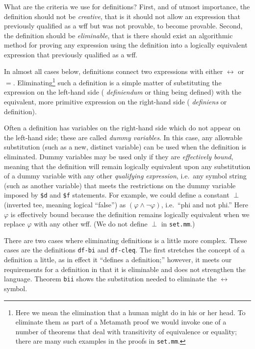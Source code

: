What are the criteria we use for definitions?  First, and of utmost importance,
the definition should not be {\em creative}, that
is it should not allow an expression that previously qualified as a wff but
was not provable, to become provable.   Second, the definition should be {\em
eliminable}, that is there should exist an
algorithmic method for proving any expression using the definition into
a logically equivalent expression that previously qualified as a wff.

In almost all cases below, definitions connect two expressions with either
$\leftrightarrow$ or $=$.  Eliminating\footnote{Here we mean the
elimination that a human might do in his or her head.  To eliminate them as
part of a Metamath proof we would invoke one of a number of
theorems that deal with transitivity of equivalence or equality; there are
many such examples in the proofs in \texttt{set.mm}.} such a definition is a
simple matter of substituting the expression on the left-hand side ({\em
definiendum} or thing being defined) with the equivalent,
more primitive expression on the right-hand side ({\em
definiens} or definition).

Often a definition has variables on the right-hand side which do not appear on
the left-hand side; these are called {\em dummy variables}.  In this case, any
allowable substitution (such as a new, distinct
variable) can be used when the definition is eliminated.  Dummy variables may
be used only if they are {\em effectively bound}, meaning that the definition will remain logically equivalent upon
any substitution of a dummy variable with any other {\em qualifying
expression}, i.e.\ any symbol string (such as
another variable) that
meets the restrictions on the dummy variable imposed by \texttt{\$d} and
\texttt{\$f} statements.  For example, we could define a constant $\perp$
(inverted tee, meaning logical ``false'') as $( \varphi \wedge \lnot \varphi
)$, i.e.\ ``phi and not phi.''  Here $\varphi$ is effectively bound because the
definition remains logically equivalent when we replace $\varphi$ with any
other wff.  (We do not define $\perp$ in \texttt{set.mm}.)

There are two cases where eliminating definitions is a little more
complex.  These cases are the definitions \texttt{df-bi} and
\texttt{df-cleq}.  The first stretches the concept of a definition a
little, as in effect it ``defines a definition;'' however, it meets our
requirements for a definition in that it is eliminable and does not
strengthen the language.  Theorem \texttt{bii} shows the substitution
needed to eliminate the $\leftrightarrow$ symbol.


